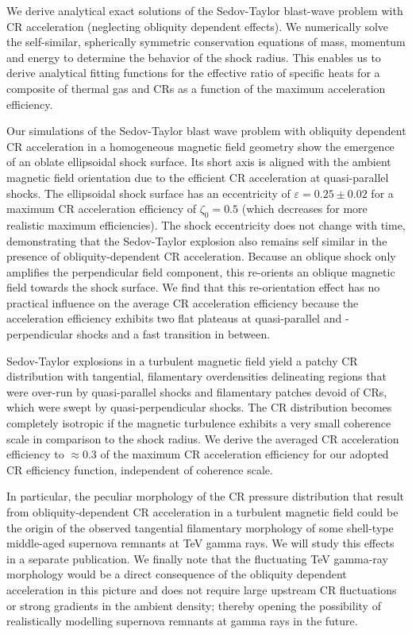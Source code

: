\documentclass[8pt,a4paper,usenatbib]{mnras}
\renewcommand{\epsilon}{\varepsilon}
\begin{document}
We derive analytical exact solutions of the Sedov-Taylor blast-wave problem with
CR acceleration (neglecting obliquity dependent effects). We numerically solve
the self-similar, spherically symmetric conservation equations of mass, momentum
and energy to determine the behavior of the shock radius. This enables us to
derive analytical fitting functions for the effective ratio of specific heats
for a composite of thermal gas and CRs as a function of the maximum acceleration
efficiency.

Our simulations of the Sedov-Taylor blast wave problem with obliquity dependent
CR acceleration in a homogeneous magnetic field geometry show the emergence of
an oblate ellipsoidal shock surface. Its short axis is aligned with the ambient
magnetic field orientation due to the efficient CR acceleration at
quasi-parallel shocks.  The ellipsoidal shock surface has an eccentricity of
$\epsilon = 0.25 \pm 0.02$ for a maximum CR acceleration efficiency of
$\zeta_0=0.5$ (which decreases for more realistic maximum efficiencies). The
shock eccentricity does not change with time, demonstrating that the
Sedov-Taylor explosion also remains self similar in the presence of
obliquity-dependent CR acceleration.  Because an oblique shock only amplifies
the perpendicular field component, this re-orients an oblique magnetic field
towards the shock surface. We find that this re-orientation effect has no
practical influence on the average CR acceleration efficiency because the
acceleration efficiency exhibits two flat plateaus at quasi-parallel and
-perpendicular shocks and a fast transition in between.

Sedov-Taylor explosions in a turbulent magnetic field yield a patchy CR
distribution with tangential, filamentary overdensities delineating regions that
were over-run by quasi-parallel shocks and filamentary patches devoid of CRs,
which were swept by quasi-perpendicular shocks. The CR distribution becomes
completely isotropic if the magnetic turbulence exhibits a very small coherence
scale in comparison to the shock radius. We derive the averaged CR acceleration
efficiency to $\approx0.3$ of the maximum CR acceleration efficiency for our
adopted CR efficiency function, independent of coherence scale.

In particular, the peculiar morphology of the CR pressure distribution that
result from obliquity-dependent CR acceleration in a turbulent magnetic field
could be the origin of the observed tangential filamentary morphology of some
shell-type middle-aged supernova remnants at TeV gamma rays. We will study this
effects in a separate publication.  We finally note that the fluctuating TeV
gamma-ray morphology would be a direct consequence of the obliquity dependent
acceleration in this picture and does not require large upstream CR
fluctuations or strong gradients in the ambient density; thereby opening the
possibility of realistically modelling supernova remnants at gamma rays in the future.
\end{document}
